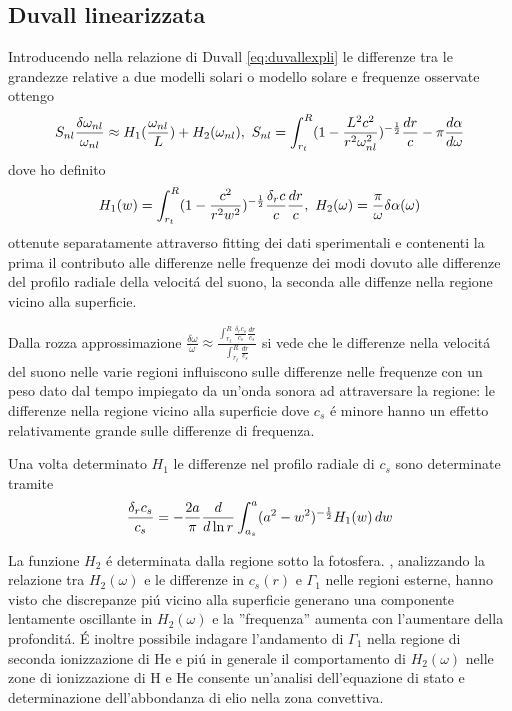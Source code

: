 \documentclass[../main.tex]{subfiles}
\begin{document}
\subsection{Duvall linearizzata}

Introducendo nella relazione di Duvall \eqref{eq:duvallexpli} le differenze tra le grandezze relative a due modelli solari o modello solare e frequenze osservate ottengo
\begin{equation}
S_{nl}\frac{\delta\omega_{nl}}{\omega_{nl}}\approx H_1(\frac{\omega_{nl}}{L})+H_2(\omega_{nl}),\ S_{nl}=\int_{r_t}^R(1-\frac{L^2c^2}{r^2\omega_{nl}^2})\expy{-\frac{1}{2}}\frac{dr}{c}-\pi\TDy{\omega}{\alpha}
\end{equation}
dove ho definito
\begin{equation}
H_1(w)=\int_{r_t}^R(1-\frac{c^2}{r^2w^2})\expy{-\frac{1}{2}}\frac{\delta_rc}{c}\frac{dr}{c},\ H_2(\omega)=\frac{\pi}{\omega}\delta\alpha(\omega)
\end{equation}
ottenute separatamente attraverso fitting dei dati sperimentali e contenenti la prima il contributo alle differenze nelle frequenze dei modi dovuto alle differenze del profilo radiale della velocit\'a del suono, la seconda alle diffenze nella regione vicino alla superficie.

Dalla rozza approssimazione $\frac{\delta\omega}{\omega}\approx\frac{\int_{r_t}^{R}\frac{\delta_rc_s}{c_s}\frac{dr}{c_s}}{\int_{r_t}^R\frac{dr}{c_s}}$ si vede che le differenze nella velocit\'a del suono nelle varie regioni influiscono sulle differenze nelle frequenze con un peso dato dal tempo impiegato da un'onda sonora ad attraversare la regione: le differenze nella regione vicino alla superficie dove $c_s$ \'e minore hanno un effetto relativamente grande sulle differenze di frequenza.

Una volta determinato $H_1$ le differenze nel profilo radiale di $c_s$ sono determinate tramite
\begin{equation}
\frac{\delta_rc_s}{c_s}=-\frac{2a}{\pi}\frac{d}{d \ln{r}}\int_{a_s}^a(a^2-w^2)^{-\frac{1}{2}}H_1(w)\,dw
\end{equation}


La funzione $H_2$ \'e determinata dalla regione sotto la fotosfera. \cite{chr92phase}, analizzando la relazione tra $H_2(\omega)$ e le differenze in $c_s(r)$ e $\Gamma_1$ nelle regioni esterne, hanno visto che discrepanze pi\'u vicino alla superficie generano una componente lentamente oscillante in $H_2(\omega)$ e la ''frequenza'' aumenta con l'aumentare della profondit\'a. \'E inoltre possibile indagare l'andamento di $\Gamma_1$ nella regione di seconda ionizzazione di He e pi\'u in generale il comportamento di $H_2(\omega)$ nelle zone di ionizzazione di H e He consente un'analisi dell'equazione di stato e determinazione dell'abbondanza di elio nella zona convettiva.
\end{document}
